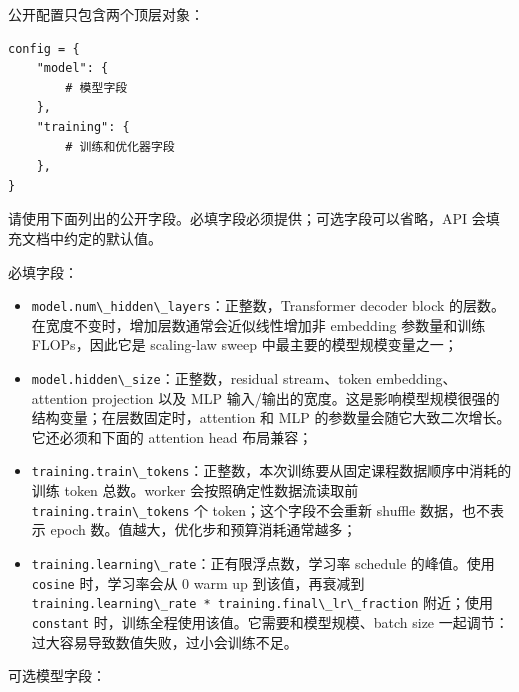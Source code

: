 \documentclass[
]{ctexart}
\newcommand{\passthrough}[1]{#1}
\providecommand{\tightlist}{%
  \setlength{\itemsep}{0pt}\setlength{\parskip}{0pt}}
\begin{document}
公开配置只包含两个顶层对象：

\begin{verbatim}
config = {
    "model": {
        # 模型字段
    },
    "training": {
        # 训练和优化器字段
    },
}
\end{verbatim}

请使用下面列出的公开字段。必填字段必须提供；可选字段可以省略，API
会填充文档中约定的默认值。

必填字段：

\begin{itemize}
\tightlist
\item
  \passthrough{\lstinline!model.num\_hidden\_layers!}：正整数，Transformer
  decoder block 的层数。在宽度不变时，增加层数通常会近似线性增加非
  embedding 参数量和训练 FLOPs，因此它是 scaling-law sweep
  中最主要的模型规模变量之一；
\item
  \passthrough{\lstinline!model.hidden\_size!}：正整数，residual
  stream、token embedding、attention projection 以及 MLP
  输入/输出的宽度。这是影响模型规模很强的结构变量；在层数固定时，attention
  和 MLP 的参数量会随它大致二次增长。它还必须和下面的 attention head
  布局兼容；
\item
  \passthrough{\lstinline!training.train\_tokens!}：正整数，本次训练要从固定课程数据顺序中消耗的训练
  token 总数。worker 会按照确定性数据流读取前
  \passthrough{\lstinline!training.train\_tokens!} 个
  token；这个字段不会重新 shuffle 数据，也不表示 epoch
  数。值越大，优化步和预算消耗通常越多；
\item
  \passthrough{\lstinline!training.learning\_rate!}：正有限浮点数，学习率
  schedule 的峰值。使用 \passthrough{\lstinline!cosine!} 时，学习率会从
  0 warm up 到该值，再衰减到
  \passthrough{\lstinline!training.learning\_rate * training.final\_lr\_fraction!}
  附近；使用 \passthrough{\lstinline!constant!}
  时，训练全程使用该值。它需要和模型规模、batch size
  一起调节：过大容易导致数值失败，过小会训练不足。
\end{itemize}

可选模型字段：
\end{document}
